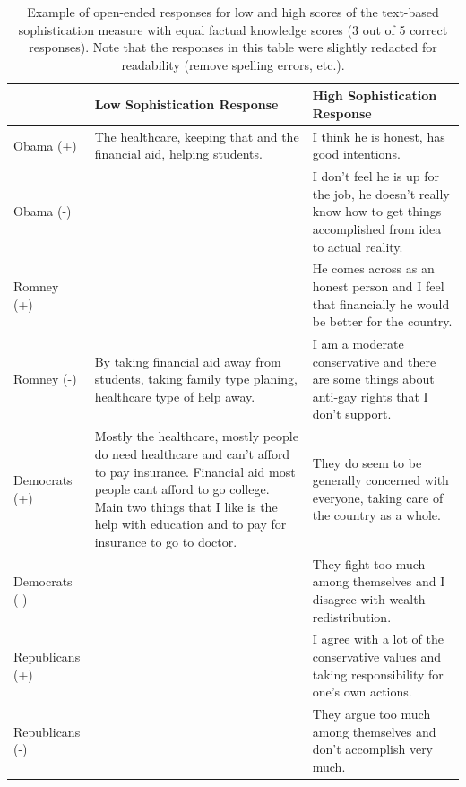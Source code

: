 \documentclass[12pt]{article}
\begin{document}
\begin{table}[ht]\footnotesize\centering
\begin{tabular}{l|p{6.5cm}|p{6.5cm}}
   \toprule
  & Low Sophistication Response & High Sophistication Response \\ 
   \midrule
   Obama (+) & The healthcare, keeping that and the financial aid, helping students. & I think he is honest, has good intentions. \\ \hdashline
     Obama (-) &  & I don't feel he is up for the job, he doesn't really know how to get things accomplished from idea to actual reality. \\ \hdashline
     Romney (+) &  & He comes across as an honest person and I feel that financially he would be better for the country. \\ \hdashline
     Romney (-) & By taking financial aid away from students, taking family type planing, healthcare type of help away. & I am a moderate conservative and there are some things about anti-gay rights that I don't support. \\ \hdashline
     Democrats (+) & Mostly the healthcare, mostly people do need healthcare and can't afford to pay insurance. Financial aid most people cant afford to go college. Main two things that I like is the help with education and to pay for insurance to go to doctor. & They do seem to be generally concerned with everyone, taking care of the country as a whole. \\ \hdashline
     Democrats (-) &  & They fight too much among themselves and I disagree with wealth redistribution. \\ \hdashline
     Republicans (+) &  & I agree with a lot of the conservative values and taking responsibility for one's own actions. \\ \hdashline
     Republicans (-) &  & They argue too much among themselves and don't accomplish very much. \\ 
    \bottomrule
 \end{tabular}
\caption{Example of open-ended responses for low and high scores of the text-based sophistication measure with equal factual knowledge scores (3 out of 5 correct responses). Note that the responses in this table were slightly redacted for readability (remove spelling errors, etc.).}\label{tab:ex1}
\end{table}
\end{document}
